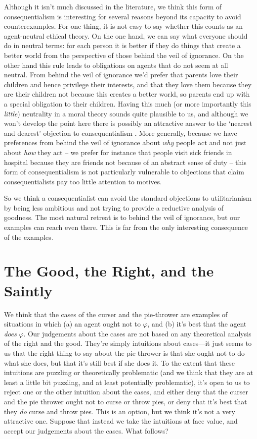 Although it isn't much discussed in the literature, we think this form of consequentialism is interesting for several reasons beyond its capacity to avoid counterexamples. For one thing, it is not easy to say whether this counts as an agent\hyp{}neutral ethical theory. On the one hand, we can say what everyone should do in neutral terms: for each person it is better if they do things that create a better world from the perspective of those behind the veil of ignorance. On the other hand this rule leads to obligations on agents that do not seem at all neutral. From behind the veil of ignorance we'd prefer that parents love their children and hence privilege their interests, and that they love them because they are their children not because this creates a better world, so parents end up with a special obligation to their children. Having this much (or more importantly this \textit{little}) neutrality in a moral theory sounds quite plausible to us, and although we won't develop the point here there is possibly an attractive answer to the `nearest and dearest' objection to consequentialism \citep{Jackson1991}. More generally, because we have preferences from behind the veil of ignorance about \textit{why} people act and not just about \textit{how} they act -- we prefer for instance that people visit sick friends in hospital because they are friends not because of an abstract sense of duty -- this form of consequentialism is not particularly vulnerable to objections that claim consequentialists pay too little attention to motives.

So we think a consequentialist can avoid the standard objections to utilitarianism by being less ambitious and not trying to provide a reductive analysis of goodness. The most natural retreat is to behind the veil of ignorance, but our examples can reach even there. This is far from the only interesting consequence of the examples.


\section{The Good, the Right, and the Saintly}

We think that the cases of the curser and the pie-thrower are examples of situations in which (a) an agent ought not to $\varphi $, and (b) it's best that the agent \textit{does} $\varphi $.  Our judgements about the cases are not based on any theoretical analysis of the right and the good.  They're simply intuitions about cases---it just seems to us that the right thing to say about the pie thrower is that she ought not to do what she does, but that it's still best if she does it.  To the extent that these intuitions are puzzling or theoretically problematic (and we think that they are at least a little bit puzzling, and at least potentially problematic), it's open to us to reject one or the other intuition about the cases, and either deny that the curser and the pie thrower ought not to curse or throw pies, or deny that it's best that they \textit{do} curse and throw pies.  This is an option, but we think it's not a very attractive one.  Suppose that instead we take the intuitions at face value, and accept our judgements about the cases.  What follows? 

